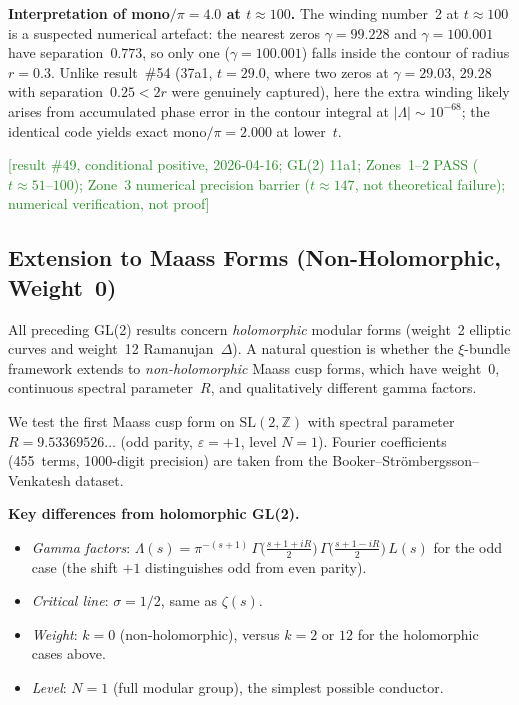 \documentclass[11pt, a4paper]{article}
\theoremstyle{definition}
\theoremstyle{plain}
\begin{document}
\medskip\noindent\textbf{Interpretation of mono$/\pi=4.0$ at $t\approx 100$.}
The winding number~2 at $t\approx 100$ is a suspected numerical artefact:
the nearest zeros $\gamma=99.228$ and $\gamma=100.001$ have separation~$0.773$,
so only one ($\gamma=100.001$) falls inside the contour of radius $r=0.3$.
Unlike result~\#54 (37a1, $t=29.0$, where two zeros at
$\gamma=29.03,\,29.28$ with separation~$0.25 < 2r$ were genuinely captured),
here the extra winding likely arises from accumulated phase error
in the contour integral at $|\Lambda|\sim 10^{-68}$;
the identical code yields exact mono$/\pi=2.000$ at lower~$t$.

\textcolor{ForestGreen}{[result \#49, conditional positive, 2026-04-16;
GL(2) 11a1; Zones~1--2 PASS ($t\approx51$--$100$);
Zone~3 numerical precision barrier ($t\approx147$, not theoretical failure);
numerical verification, not proof]}

\subsection{Extension to Maass Forms (Non-Holomorphic, Weight~0)}
\label{sec:maass}

All preceding GL(2) results concern \emph{holomorphic} modular forms
(weight~2 elliptic curves and weight~12 Ramanujan~$\Delta$).
A natural question is whether the $\xi$-bundle framework extends to
\emph{non-holomorphic} Maass cusp forms, which have weight~0, continuous
spectral parameter~$R$, and qualitatively different gamma factors.

We test the first Maass cusp form on $\mathrm{SL}(2,\mathbb{Z})$
with spectral parameter $R = 9.53369526\ldots$ (odd parity,
$\varepsilon = +1$, level $N = 1$).
Fourier coefficients (455~terms, 1000-digit precision) are taken from
the Booker--Str\"ombergsson--Venkatesh dataset.

\medskip\noindent
\textbf{Key differences from holomorphic GL(2).}
\begin{itemize}
  \item \emph{Gamma factors}: $\Lambda(s) = \pi^{-(s+1)}\,
        \Gamma\!\bigl(\tfrac{s+1+iR}{2}\bigr)\,
        \Gamma\!\bigl(\tfrac{s+1-iR}{2}\bigr)\,L(s)$
        for the odd case (the shift $+1$ distinguishes odd from even parity).
  \item \emph{Critical line}: $\sigma = 1/2$, same as $\zeta(s)$.
  \item \emph{Weight}: $k = 0$ (non-holomorphic), versus $k = 2$ or $12$ for
        the holomorphic cases above.
  \item \emph{Level}: $N = 1$ (full modular group), the simplest possible conductor.
\end{itemize}
\end{document}
